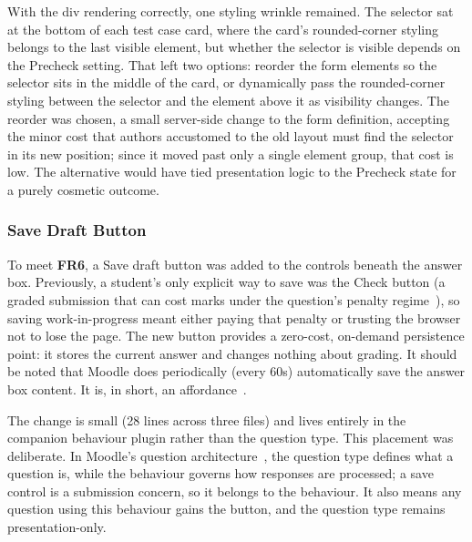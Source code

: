 With the div rendering correctly, one styling wrinkle remained. The selector sat at the bottom of each test case card, where the card's rounded-corner styling belongs to the last visible element, but whether the selector is visible depends on the Precheck setting. That left two options: reorder the form elements so the selector sits in the middle of the card, or dynamically pass the rounded-corner styling between the selector and the element above it as visibility changes. The reorder was chosen, a small server-side change to the form definition, accepting the minor cost that authors accustomed to the old layout must find the selector in its new position; since it moved past only a single element group, that cost is low. The alternative would have tied presentation logic to the Precheck state for a purely cosmetic outcome.

\subsubsection{Save Draft Button}
To meet \textbf{FR6}, a Save draft button was added to the controls beneath the answer box. Previously, a student's only explicit way to save was the Check button (a graded submission that can cost marks under the question's penalty regime~\cite{CodeRunner2016}), so saving work-in-progress meant either paying that penalty or trusting the browser not to lose the page. The new button provides a zero-cost, on-demand persistence point: it stores the current answer and changes nothing about grading. It should be noted that Moodle does periodically (every 60s) automatically save the answer box content. It is, in short, an affordance~\cite{designofeveryday}.

The change is small (28 lines across three files) and lives entirely in the companion behaviour plugin rather than the question type. This placement was deliberate. In Moodle's question architecture~\cite{moodlequestionbehaviours}, the question type defines what a question is, while the behaviour governs how responses are processed; a save control is a submission concern, so it belongs to the behaviour. It also means any question using this behaviour gains the button, and the question type remains presentation-only.


